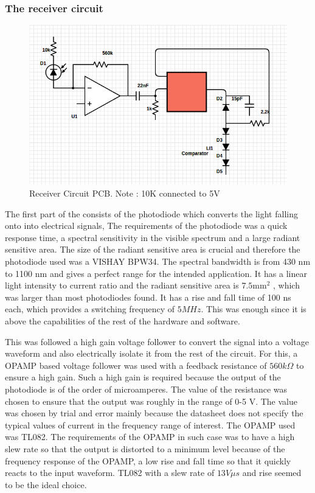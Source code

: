 \documentclass{article}
\begin{document}
\subsubsection{The receiver circuit}
\begin{figure}[h]
  \centering
  \includegraphics[scale=0.5]{images/receiver_ckt_diag}
  \caption{Receiver Circuit PCB. Note : 10K connected to 5V}
  \label{fig:rx_circuit}
\end{figure}
The first part of the consists of the photodiode which converts the light falling onto into electrical signals, The requirements of the photodiode was a quick response time, a spectral sensitivity in the visible spectrum and a large radiant sensitive area. The size of the
radiant sensitive area is crucial and therefore the photodiode used was a VISHAY BPW34. The spectral bandwidth is from 430 nm to 1100 nm and gives a perfect range for the intended application. It has a linear light intensity to current ratio and the radiant sensitive area is $7.5 \text{mm}^2$ , which was larger than most photodiodes found. It has a rise
and fall time of 100 ns each, which provides a switching frequency of $5 MHz$. This was enough since it is above the capabilities of the rest of the hardware and software.

This was followed a high gain voltage follower to convert the signal into a voltage waveform and also electrically isolate it from the rest of the circuit. For this, a OPAMP based voltage follower was used with a feedback resistance of $560 k \Omega$ to ensure a high gain. Such a high gain is required because the output of the photodiode is of the order of microamperes. The value of the resistance was chosen to ensure that the output was roughly in the range of 0-5 V. The value was chosen by trial and error mainly because the datasheet does not specify the typical values of current in the frequency range of interest. The OPAMP used was TL082. The requirements of the OPAMP in such case was to have a high slew rate so that the output is distorted to a minimum level because of the frequency response of the OPAMP, a low rise and fall time so that it quickly reacts to the input waveform. TL082 with a slew rate of $13 V\mu s$ and rise  seemed to be the ideal choice.
\end{document}

